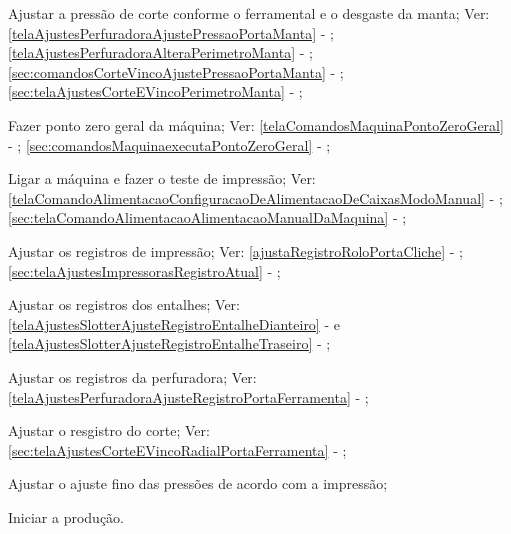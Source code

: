 \begin{procedureAdjustmentNoRecipe}
  \fi
  \item[\ding{\dingNumber}] Ajustar a pressão de corte conforme o ferramental e o desgaste da manta; Ver: 
  \ifmachineType
  \ref{telaAjustesPerfuradoraAjustePressaoPortaManta} - ;
  \ref{telaAjustesPerfuradoraAlteraPerimetroManta} - ;
  \else
  \ref{sec:comandosCorteVincoAjustePressaoPortaManta} - ;
  \ref{sec:telaAjustesCorteEVincoPerimetroManta} - ;
  \fi
  \item[\ding{\dingNumber}] Fazer ponto zero geral da máquina; Ver: 
  \ifmachineType
  \ref{telaComandosMaquinaPontoZeroGeral} - ;
  \else
  \ref{sec:comandosMaquinaexecutaPontoZeroGeral} - ;
  \fi
  \item[\ding{\dingNumber}] Ligar a máquina e fazer o teste de impressão; Ver: 
  \ifmachineType
  \ref{telaComandoAlimentacaoConfiguracaoDeAlimentacaoDeCaixasModoManual} - ;
  \else
  \ref{sec:telaComandoAlimentacaoAlimentacaoManualDaMaquina} - ;
  \fi
  \item[\ding{\dingNumber}] Ajustar os registros de impressão; Ver: 
  \ifmachineType
  \ref{ajustaRegistroRoloPortaCliche} - ;
  \else
  \ref{sec:telaAjustesImpressorasRegistroAtual} - ;
  \fi
  \ifmachineType
  \item[\ding{\dingNumber}] Ajustar os registros dos entalhes; Ver: \ref{telaAjustesSlotterAjusteRegistroEntalheDianteiro} -  e \ref{telaAjustesSlotterAjusteRegistroEntalheTraseiro} - ;
  \item[\ding{\dingNumber}] Ajustar os registros da perfuradora; Ver: \ref{telaAjustesPerfuradoraAjusteRegistroPortaFerramenta} - ;
  \else
  \item[\ding{\dingNumber}] Ajustar o resgistro do corte; Ver: \ref{sec:telaAjustesCorteEVincoRadialPortaFerramenta} - ;
  \fi
  \item[\ding{\dingNumber}] Ajustar o ajuste fino das pressões de acordo com a impressão;
  \item[\ding{\dingNumber}] Iniciar a produção.
  
\end{procedureAdjustmentNoRecipe}


